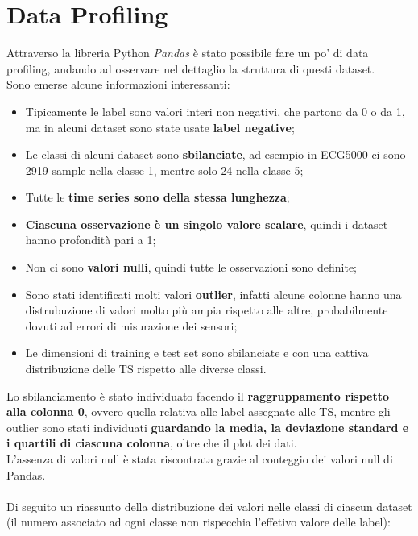 \section{Data Profiling} \label{sec:profiling}
Attraverso la libreria Python \textit{Pandas} è stato possibile fare un po' di data profiling, andando ad osservare nel dettaglio la struttura di questi dataset.\\
Sono emerse alcune informazioni interessanti:
\begin{itemize}
	\item Tipicamente le label sono valori interi non negativi, che partono da 0 o da 1, ma in alcuni dataset sono state usate \textbf{label negative};
	\item Le classi di alcuni dataset sono \textbf{sbilanciate}, ad esempio in ECG5000 ci sono 2919 sample nella classe 1, mentre solo 24 nella classe 5;
	\item Tutte le \textbf{time series sono della stessa lunghezza};
	\item \textbf{Ciascuna osservazione è un singolo valore scalare}, quindi i dataset hanno profondità pari a 1;
	\item Non ci sono \textbf{valori nulli}, quindi tutte le osservazioni sono definite;
	\item Sono stati identificati molti valori \textbf{outlier}, infatti alcune colonne hanno una distrubuzione di valori molto più ampia rispetto alle altre, probabilmente dovuti ad errori di misurazione dei sensori;
	\item Le dimensioni di training e test set sono sbilanciate e con una cattiva distribuzione delle TS rispetto alle diverse classi.
\end{itemize}
Lo sbilanciamento è stato individuato facendo il \textbf{raggruppamento rispetto alla colonna 0}, ovvero quella relativa alle label assegnate alle TS, mentre gli outlier sono stati individuati \textbf{guardando la media, la deviazione standard e i quartili di ciascuna colonna}, oltre che il plot dei dati.\\
L'assenza di valori null è stata riscontrata grazie al conteggio dei valori null di Pandas.\\
\\
Di seguito un riassunto della distribuzione dei valori nelle classi di ciascun dataset (il numero associato ad ogni classe non rispecchia l'effetivo valore delle label):
